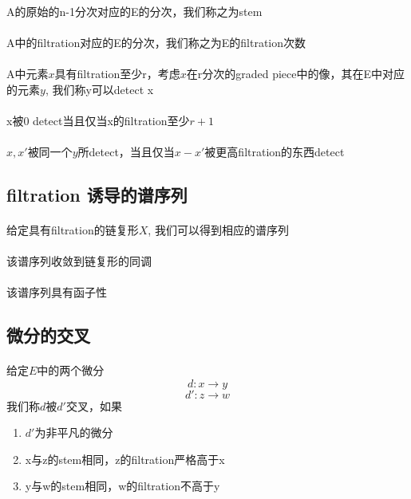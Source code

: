 \documentclass[12pt,a4paper]{article}
\begin{document}
\begin{sloppy}
\paragraph{}A的原始的n-1分次对应的E的分次，我们称之为stem

\paragraph{}A中的filtration对应的E的分次，我们称之为E的filtration次数

\paragraph{}
A中元素$x$具有filtration至少r，考虑$x$在r分次的graded piece中的像，其在E中对应的元素$y$, 我们称y可以detect x

\paragraph{} x被0 detect当且仅当x的filtration至少$r+1$

\paragraph{}
$x,x'$被同一个$y$所detect，当且仅当$x-x'$被更高filtration的东西detect

\subsection{filtration 诱导的谱序列}
\paragraph{}
给定具有filtration的链复形$X$, 我们可以得到相应的谱序列

\paragraph{}
该谱序列收敛到链复形的同调

\paragraph{}
该谱序列具有函子性

\subsection{微分的交叉}
\paragraph{}
给定$E$中的两个微分
$$d:x\xrightarrow{}y$$
$$d':z\xrightarrow{}w$$
我们称$d$被$d'$交叉，如果
\begin{enumerate}
\item $d'$为非平凡的微分
    \item x与z的stem相同，z的filtration严格高于x
    \item y与w的stem相同，w的filtration不高于y
\end{enumerate}


\end{sloppy}
\end{document}
